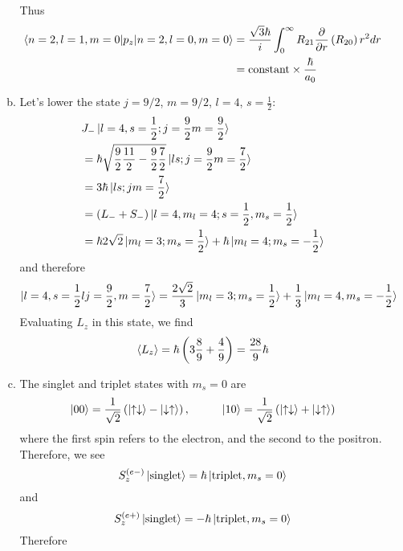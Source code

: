 \documentclass[12pt, letterpaper]{article}
\begin{document}
\begin{enumerate}
\begin{enumerate}[(a)]
\begin{equation}
\end{equation}
Thus
\begin{align}
    \braket{n=2,l=1,m=0|p_z|n=2,l=0,m=0}&=\frac{\sqrt{3}\hbar}{i}\int_0^\infty R_{21}\frac{\partial}{\partial r}\left(R_{20}\right)r^2dr\\&=\text{constant}\times \frac{\hbar}{a_0}
\end{align}
\item 
Let's lower the state $j=9/2$, $m=9/2$, $l=4$, $s=\frac{1}{2}$:
\begin{align}
         &J_-\ket{l=4,s=\frac{1}{2};j=\frac{9}{2}m=\frac{9}{2}}\\&=\hbar \sqrt{\frac{9}{2}\frac{11}{2}-\frac{9}{2}\frac{7}{2}}\ket{ls;j=\frac{9}{2}m=\frac{7}{2}}\\&=3\hbar \ket{ls;jm=\frac{7}{2}}\\&=\left(L_-+S_-\right)\ket{l=4,m_l=4;s=\frac{1}{2},m_s=\frac{1}{2}}\\&=\hbar 2\sqrt{2}\ket{m_l=3;m_s=\frac{1}{2}}+\hbar\ket{m_l=4;m_s=-\frac{1}{2}}
\end{align}
and therefore
\begin{equation}
        \ket{l=4,s=\frac{1}{2}lj=\frac{9}{2},m=\frac{7}{2}}=\frac{2\sqrt{2}}{3}\ket{m_l=3;m_s=\frac{1}{2}}+\frac{1}{3}\ket{m_l=4,m_s=-\frac{1}{2}}
\end{equation}
Evaluating $L_z$ in this state, we find
\begin{equation}
        \braket{L_z}=\hbar \left(3\frac{8}{9}+\frac{4}{9}\right)=\frac{28}{9}\hbar 
\end{equation}
\item 
The singlet and triplet states with $m_s=0$ are
\begin{equation}
        \ket{00}=\frac{1}{\sqrt{2}}\left(\ket{\uparrow \downarrow}-\ket{\downarrow\uparrow}\right),\hspace{1cm}\ket{10}=\frac{1}{\sqrt{2}}\left(\ket{\uparrow \downarrow}+\ket{\downarrow\uparrow}\right)
\end{equation}
where the first spin refers to the electron, and the second to the positron. Therefore, we see
\begin{equation}
        S_z^{(e-)}\ket{\text{singlet}}=\hbar \ket{\text{triplet},m_s=0}
\end{equation}
and 
\begin{equation}
        S_z^{(e+)}\ket{\text{singlet}}=-\hbar \ket{\text{triplet},m_s=0}
\end{equation}
Therefore
\begin{equation}

\end{equation}
\end{enumerate}
\end{enumerate}
\end{document}
